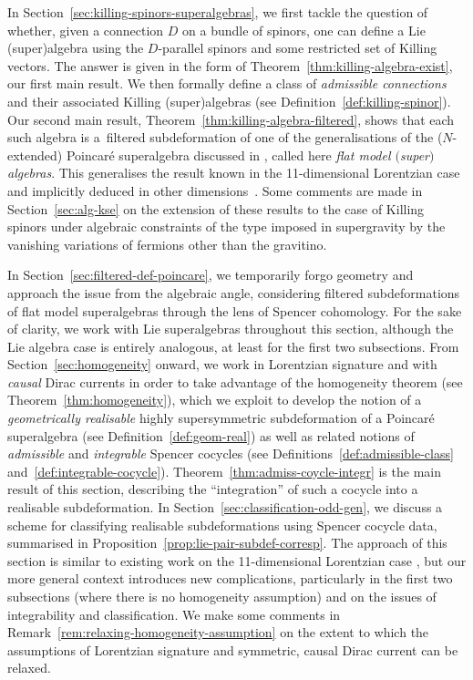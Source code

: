 \documentclass[10pt,a4paper]{amsart}
\numberwithin{equation}{section}
\newcommand{\1}{\mathbbm{1}}
\begin{document}
In Section~\ref{sec:killing-spinors-superalgebras}, we first tackle the question of whether, given a connection $D$ on a bundle of spinors, one can define a Lie (super)algebra using the $D$-parallel spinors and some restricted set of Killing vectors. The answer is given in the form of Theorem~\ref{thm:killing-algebra-exist}, our first main result. We then formally define a class of \emph{admissible connections} and their associated Killing (super)algebras (see Definition~\ref{def:killing-spinor}). Our second main result, Theorem~\ref{thm:killing-algebra-filtered}, shows that each such algebra is a~filtered subdeformation of one of the generalisations of the ($N$-extended) Poincar\'e superalgebra discussed in \cite{Alekseevsky1997}, called here \emph{flat model $($super$)$algebras}. This generalises the result known in the 11-dimensional Lorentzian case \cite[Theorem~12]{Figueroa-OFarrill2017_1} and implicitly deduced in other dimensions~\cite{Beckett2021,deMedeiros2016,deMedeiros2018}. Some comments are made in Section~\ref{sec:alg-kse} on the extension of these results to the case of Killing spinors under algebraic constraints of the type imposed in supergravity by the vanishing variations of fermions other than the gravitino.

In Section~\ref{sec:filtered-def-poincare}, we temporarily forgo geometry and approach the issue from the algebraic angle, considering filtered subdeformations of flat model superalgebras through the lens of Spencer cohomology. For the sake of clarity, we work with Lie superalgebras throughout this section, although the Lie algebra case is entirely analogous, at least for the first two subsections. From Section~\ref{sec:homogeneity} onward, we work in Lorentzian signature and with \emph{causal} Dirac currents in order to take advantage of the homogeneity theorem (see Theorem~\ref{thm:homogeneity}), which we exploit to develop the notion of a \emph{geometrically realisable} highly supersymmetric subdeformation of a Poincar\'e superalgebra (see Definition~\ref{def:geom-real}) as well as related notions of \emph{admissible} and \emph{integrable} Spencer cocycles (see Definitions~\ref{def:admissible-class} and~\ref{def:integrable-cocycle}). Theorem~\ref{thm:admiss-coycle-integr} is the main result of this section, describing the ``integration'' of such a cocycle into a realisable subdeformation. In Section~\ref{sec:classification-odd-gen}, we discuss a scheme for classifying realisable subdeformations using Spencer cocycle data, summarised in Proposition~\ref{prop:lie-pair-subdef-corresp}. The approach of this section is similar to existing work on the 11-dimensional Lorentzian case \cite{Figueroa-OFarrill2017_1, Santi2022}, but our more general context introduces new complications, particularly in the first two subsections (where there is no homogeneity assumption) and on the issues of integrability and classification. We make some comments in Remark~\ref{rem:relaxing-homogeneity-assumption} on the extent to which the assumptions of Lorentzian signature and symmetric, causal Dirac current can be relaxed.
\end{document}
